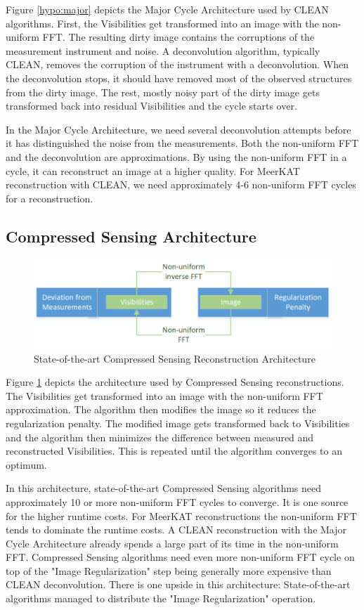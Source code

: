Figure \ref{hypo:major} depicts the Major Cycle Architecture used by CLEAN algorithms. First, the Visibilities get transformed into an image with the non-uniform FFT. The resulting dirty image contains the corruptions of the measurement instrument and noise. A deconvolution algorithm, typically CLEAN, removes the corruption of the instrument with a deconvolution. When the deconvolution stops, it should have removed most of the observed structures from the dirty image. The rest, mostly noisy part of the dirty image gets transformed back into residual Visibilities and the cycle starts over.

In the Major Cycle Architecture, we need several deconvolution attempts before it has distinguished the noise from the measurements. Both the non-uniform FFT and the deconvolution are approximations. By using the non-uniform FFT in a cycle, it can reconstruct an image at a higher quality. For MeerKAT reconstruction with CLEAN, we need approximately 4-6 non-uniform FFT cycles for a reconstruction.


\subsection{Compressed Sensing Architecture}\label{hypo:CSArch}

\begin{figure}[h]
	\centering
	\includegraphics[width=0.80\linewidth]{./chapters/02.hypo/CS2.png}
	\caption{State-of-the-art Compressed Sensing Reconstruction Architecture}
	\label{hypo:cs}
\end{figure}

Figure \ref{hypo:cs} depicts the architecture used by Compressed Sensing reconstructions. The Visibilities get transformed into an image with the non-uniform FFT approximation. The algorithm then modifies the image so it reduces the regularization penalty. The modified image gets transformed back to Visibilities and the algorithm then minimizes the difference between measured and reconstructed Visibilities. This is repeated until the algorithm converges to an optimum.

In this architecture, state-of-the-art Compressed Sensing algorithms need approximately 10 or more non-uniform FFT cycles to converge. It is one source for the higher runtime costs. For MeerKAT reconstructions the non-uniform FFT tends to dominate the runtime costs. A CLEAN reconstruction with the Major Cycle Architecture already spends a large part of its time in the non-uniform FFT. Compressed Sensing algorithms need even more non-uniform FFT cycle on top of the "Image Regularization" step being generally more expensive than CLEAN deconvolution. There is one upside in this architecture: State-of-the-art algorithms managed to distribute the "Image Regularization" operation.

